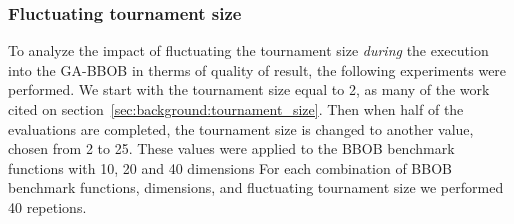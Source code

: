 \subsubsection*{Fluctuating tournament size}

To analyze the impact of fluctuating the tournament size \textit{during} the execution into the GA-BBOB in therms of quality of result, the following experiments were performed. We start with the tournament size equal to 2, as many of the work cited on section~\ref{sec:background:tournament_size}. Then when half of the evaluations are completed, the tournament size is changed to another value, chosen from 2 to 25. These values were applied to the BBOB benchmark functions with 10, 20 and 40 dimensions For each combination of BBOB benchmark functions, dimensions, and fluctuating tournament size we performed 40 repetions.


